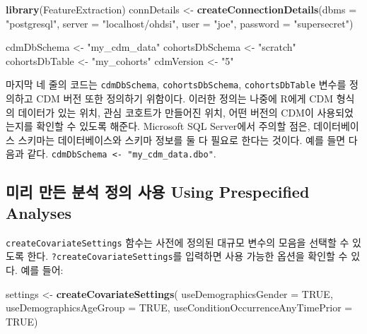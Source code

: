 \documentclass[10.5pt]{book}
\newenvironment{Shaded}{\begin{snugshade}}{\end{snugshade}}
\newcommand{\KeywordTok}[1]{\textcolor[rgb]{0.13,0.29,0.53}{\textbf{#1}}}
\newcommand{\DataTypeTok}[1]{\textcolor[rgb]{0.13,0.29,0.53}{#1}}
\newcommand{\StringTok}[1]{\textcolor[rgb]{0.31,0.60,0.02}{#1}}
\newcommand{\OtherTok}[1]{\textcolor[rgb]{0.56,0.35,0.01}{#1}}
\newcommand{\NormalTok}[1]{#1}
\theoremstyle{definition}
\theoremstyle{definition}
\theoremstyle{definition}
\theoremstyle{remark}
\begin{document}
\begin{Shaded}
\begin{Highlighting}[]
\KeywordTok{library}\NormalTok{(FeatureExtraction)}
\NormalTok{connDetails <-}\StringTok{ }\KeywordTok{createConnectionDetails}\NormalTok{(}\DataTypeTok{dbms =} \StringTok{"postgresql"}\NormalTok{,}
                                       \DataTypeTok{server =} \StringTok{"localhost/ohdsi"}\NormalTok{,}
                                       \DataTypeTok{user =} \StringTok{"joe"}\NormalTok{,}
                                       \DataTypeTok{password =} \StringTok{"supersecret"}\NormalTok{)}

\NormalTok{cdmDbSchema <-}\StringTok{ "my_cdm_data"}
\NormalTok{cohortsDbSchema <-}\StringTok{ "scratch"}
\NormalTok{cohortsDbTable <-}\StringTok{ "my_cohorts"}
\NormalTok{cdmVersion <-}\StringTok{ "5"}
\end{Highlighting}
\end{Shaded}

마지막 네 줄의 코드는 \texttt{cdmDbSchema}, \texttt{cohortsDbSchema},
\texttt{cohortsDbTable} 변수를 정의하고 CDM 버전 또한 정의하기 위함이다.
이러한 정의는 나중에 R에게 CDM 형식의 데이터가 있는 위치, 관심 코호트가
만들어진 위치, 어떤 버전의 CDM이 사용되었는지를 확인할 수 있도록 해준다.
Microsoft SQL Server에서 주의할 점은, 데이터베이스 스키마는
데이터베이스와 스키마 정보를 둘 다 필요로 한다는 것이다. 예를 들면
다음과 같다. \texttt{cdmDbSchema\ \textless{}-\ "my\_cdm\_data.dbo"}.

\subsection{미리 만든 분석 정의 사용 Using Prespecified
Analyses}\label{-----using-prespecified-analyses}

\texttt{createCovariateSettings} 함수는 사전에 정의된 대규모 변수의
모음을 선택할 수 있도록 한다. \texttt{?createCovariateSettings}를
입력하면 사용 가능한 옵션을 확인할 수 있다. 예를 들어:

\begin{Shaded}
\begin{Highlighting}[]
\NormalTok{settings <-}\StringTok{ }\KeywordTok{createCovariateSettings}\NormalTok{(}
  \DataTypeTok{useDemographicsGender =} \OtherTok{TRUE}\NormalTok{,}
  \DataTypeTok{useDemographicsAgeGroup =} \OtherTok{TRUE}\NormalTok{,}
  \DataTypeTok{useConditionOccurrenceAnyTimePrior =} \OtherTok{TRUE}\NormalTok{)}
\end{Highlighting}
\end{Shaded}
\end{document}
